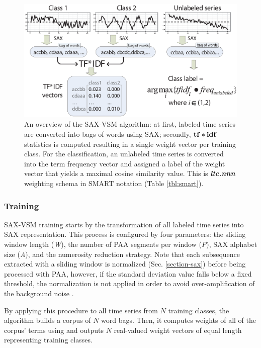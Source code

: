 \begin{figure}[t]
   \centering
   \includegraphics[width=148mm]{figures/SAX-VSM_overview.eps}
   \caption[An overview of the SAX-VSM algorithm.]{
   An overview of the SAX-VSM algorithm: 
   at first, labeled time series are converted into bags of words using SAX; 
   secondly, $\text{\textbf{tf}}\ast\text{\textbf{idf}}$ statistics is computed resulting in 
   a single weight vector per training class. For the classification, an unlabeled 
   time series is converted into the term frequency vector and assigned a 
   label of the weight vector that yields a maximal cosine similarity value.
   This is \textit{\textbf{ltc.nnn}} weighting schema in SMART notation (Table \ref{tbl:smart}).}
   \label{fig:sax-vsm_overview}
\end{figure}

\subsubsection{Training}
SAX-VSM training starts by the transformation of all labeled time series into SAX representation. 
This process is configured by four parameters: 
the sliding window length (\textit{W}), 
the number of PAA segments per window (\textit{P}), 
SAX alphabet size (\textit{A}),
and the numerosity reduction strategy.
Note that each subsequence extracted with a sliding window is normalized (Sec. \ref{section-sax}) 
before being processed with PAA, however, if the standard deviation value falls below a fixed threshold, 
the normalization is not applied in order to avoid over-amplification of the background noise \cite{sax}. 

By applying this procedure to all time series from $N$ training classes, the algorithm builds a corpus of 
$N$ word bags. 
Then, it computes weights of all of the corpus' terms using \tfidf and outputs $N$ real-valued weight vectors of 
equal length representing training classes. 

